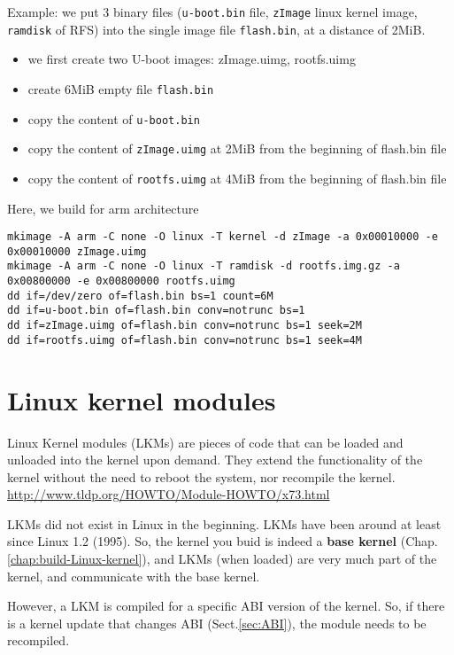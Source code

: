 Example: we put 3 binary files (\verb!u-boot.bin! file, \verb!zImage! linux
kernel image, \verb!ramdisk! of RFS) into the
single image file \verb!flash.bin!, at a distance of 2MiB. 
\begin{itemize}
  \item we first create two U-boot images: zImage.uimg, rootfs.uimg
  
  \item create 6MiB empty file \verb!flash.bin!
  
  \item copy the content of \verb!u-boot.bin!
  \item copy the content of \verb!zImage.uimg! at 2MiB from the beginning of
  flash.bin file
  \item copy the content of \verb!rootfs.uimg! at 4MiB from the beginning of
  flash.bin file
\end{itemize}
Here, we build for arm architecture
\begin{verbatim}
mkimage -A arm -C none -O linux -T kernel -d zImage -a 0x00010000 -e 0x00010000 zImage.uimg
mkimage -A arm -C none -O linux -T ramdisk -d rootfs.img.gz -a 0x00800000 -e 0x00800000 rootfs.uimg
dd if=/dev/zero of=flash.bin bs=1 count=6M
dd if=u-boot.bin of=flash.bin conv=notrunc bs=1
dd if=zImage.uimg of=flash.bin conv=notrunc bs=1 seek=2M
dd if=rootfs.uimg of=flash.bin conv=notrunc bs=1 seek=4M
\end{verbatim}


\section{Linux kernel modules}
\label{sec:kernel-modules}

Linux Kernel modules (LKMs) are pieces of code that can be loaded and unloaded
into the kernel upon demand. They extend the functionality of the kernel without the need
to reboot the system, nor recompile the kernel.
\url{http://www.tldp.org/HOWTO/Module-HOWTO/x73.html}

LKMs did not exist in Linux in the beginning.
LKMs have been around at least since Linux 1.2 (1995).
So, the kernel you buid is indeed a {\bf base kernel}
(Chap.\ref{chap:build-Linux-kernel}), and LKMs (when loaded) are very much part
of the kernel, and communicate with the base kernel.

However, a LKM is compiled for a specific ABI version of the kernel. So, if
there is a kernel update that changes ABI (Sect.\ref{sec:ABI}), the module needs to be
recompiled.

